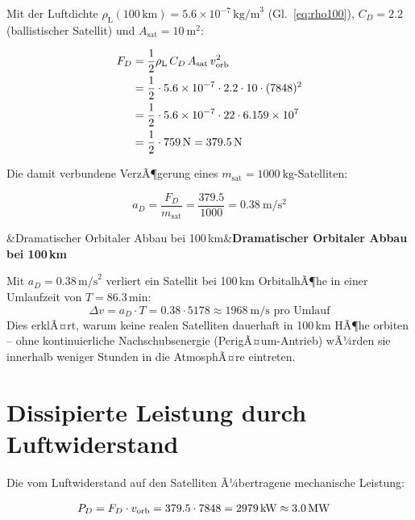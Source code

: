 ﻿\documentclass[12pt, a4paper]{report}
\newenvironment{wichtig}[1][]{%
  \begin{wichtigframe}\sloppy%
  \ifx&#1&\else\textbf{#1}\par\smallskip\fi}{\end{wichtigframe}}
\theoremstyle{definition}
\theoremstyle{remark}
\newcommand{\rhoL}{\rho_{\text{L}}}
\begin{document}
Mit der Luftdichte $\rhoL(100\,\text{km}) = 5.6 \times 10^{-7}\,\text{kg/m}^3$
(Gl.~\eqref{eq:rho100}), $C_D = 2.2$ (ballistischer Satellit) und
$A_{\text{sat}} = \SI{10}{\metre\squared}$:

\begin{align}
  F_D &= \frac{1}{2} \rhoL \, C_D \, A_{\text{sat}} \, v_{\text{orb}}^2 \notag \\
  &= \frac{1}{2} \cdot 5.6 \times 10^{-7} \cdot 2.2 \cdot 10 \cdot (7848)^2 \notag \\
  &= \frac{1}{2} \cdot 5.6 \times 10^{-7} \cdot 22 \cdot 6.159 \times 10^7 \notag \\
  &= \frac{1}{2} \cdot 759\,\text{N} = \SI{379.5}{\newton}
  \label{eq:fd_sat_100}
\end{align}

Die damit verbundene VerzÃ¶gerung eines $m_{\text{sat}} = \SI{1000}{\kilo\gram}$-Satelliten:

\begin{equation}
  a_D = \frac{F_D}{m_{\text{sat}}} = \frac{379.5}{1000} = \SI{0.38}{\metre\per\second\squared}
  \label{eq:a_drag_sat}
\end{equation}

\begin{wichtig}[Dramatischer Orbitaler Abbau bei 100\,km]
  Mit $a_D = 0.38\,\text{m/s}^2$ verliert ein Satellit bei 100\,km OrbitalhÃ¶he
  in einer Umlaufzeit von $T = 86.3\,\text{min}$:
  \begin{equation}
    \Delta v = a_D \cdot T = 0.38 \cdot 5178 \approx \SI{1968}{\metre\per\second}\text{ pro Umlauf}
  \end{equation}
  Dies erklÃ¤rt, warum keine realen Satelliten dauerhaft in 100\,km HÃ¶he orbiten --
  ohne kontinuierliche Nachschubsenergie (PerigÃ¤um-Antrieb) wÃ¼rden sie innerhalb
  weniger Stunden in die AtmosphÃ¤re eintreten.
\end{wichtig}

\section{Dissipierte Leistung durch Luftwiderstand}

Die vom Luftwiderstand auf den Satelliten Ã¼bertragene mechanische Leistung:

\begin{align}
  P_D &= F_D \cdot v_{\text{orb}} = 379.5 \cdot 7848 = \SI{2\,979}{\kilo\watt} \approx \SI{3.0}{\mega\watt}
  \label{eq:pd_sat}
\end{align}
\end{document}
